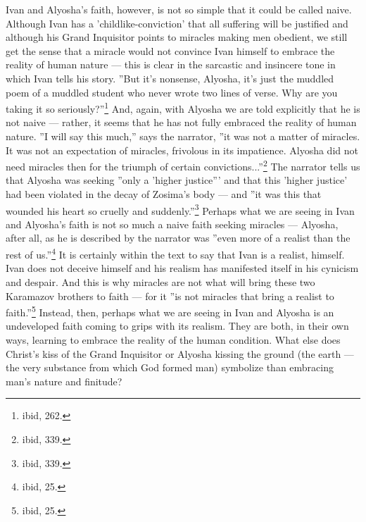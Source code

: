 Ivan and Alyosha's faith, however, is not so simple that it could be called naive. Although Ivan has a 'childlike-conviction' that all suffering will be justified and although his Grand Inquisitor points to miracles making men obedient, we still get the sense that a miracle would not convince Ivan himself to embrace the reality of human nature --- this is clear in the sarcastic and insincere tone in which Ivan tells his story. ''But it's nonsense, Alyosha, it's just the muddled poem of a muddled student who never wrote two lines of verse. Why are you taking it so seriously?''\footnote{ibid, 262.} And, again, with Alyosha we are told explicitly that he is not naive --- rather, it seems that he has not fully embraced the reality of human nature. ''I will say this much,'' says the narrator, ''it was not a matter of miracles. It was not an expectation of miracles, frivolous in its impatience. Alyosha did not need miracles then for the triumph of certain convictions...''\footnote{ibid, 339.} The narrator tells us that Alyosha was seeking ''only a 'higher justice''' and that this 'higher justice' had been violated in the decay of Zosima's body --- and ''it was this that wounded his heart so cruelly and suddenly.''\footnote{ibid, 339.} Perhaps what we are seeing in Ivan and Alyosha's faith is not so much a naive faith seeking miracles --- Alyosha, after all, as he is described by the narrator was ''even more of a realist than the rest of us.''\footnote{ibid, 25.} It is certainly within the text to say that Ivan is a realist, himself. Ivan does not deceive himself and his realism has manifested itself in his cynicism and despair. And this is why miracles are not what will bring these two Karamazov brothers to faith --- for it ''is not miracles that bring a realist to faith.''\footnote{ibid, 25.} Instead, then, perhaps what we are seeing in Ivan and Alyosha is an undeveloped faith coming to grips with its realism. They are both, in their own ways, learning to embrace the reality of the human condition. What else does Christ's kiss of the Grand Inquisitor or Alyosha kissing the ground (the earth --- the very substance from which God formed man) symbolize than embracing man's nature and finitude?

